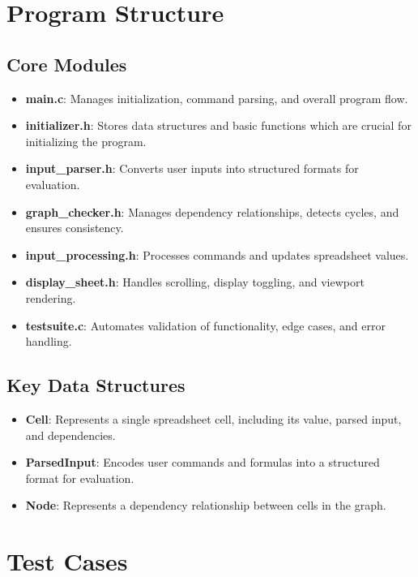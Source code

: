 \documentclass[12pt]{article}
\begin{document}
\section*{Program Structure}

\subsection*{Core Modules}
\begin{itemize}
    \item \textbf{main.c}: Manages initialization, command parsing, and overall program flow.
    \item \textbf{initializer.h}: Stores data structures and basic functions which are crucial for initializing the program.
    \item \textbf{input\_parser.h}: Converts user inputs into structured formats for evaluation.
    \item \textbf{graph\_checker.h}: Manages dependency relationships, detects cycles, and ensures consistency.
    \item \textbf{input\_processing.h}: Processes commands and updates spreadsheet values.
    \item \textbf{display\_sheet.h}: Handles scrolling, display toggling, and viewport rendering.
    \item \textbf{testsuite.c}: Automates validation of functionality, edge cases, and error handling.
\end{itemize}

\subsection*{Key Data Structures}
\begin{itemize}
    \item \textbf{Cell}: Represents a single spreadsheet cell, including its value, parsed input, and dependencies.
    \item \textbf{ParsedInput}: Encodes user commands and formulas into a structured format for evaluation.
    \item \textbf{Node}: Represents a dependency relationship between cells in the graph.
\end{itemize}

\section*{Test Cases}
\end{document}
